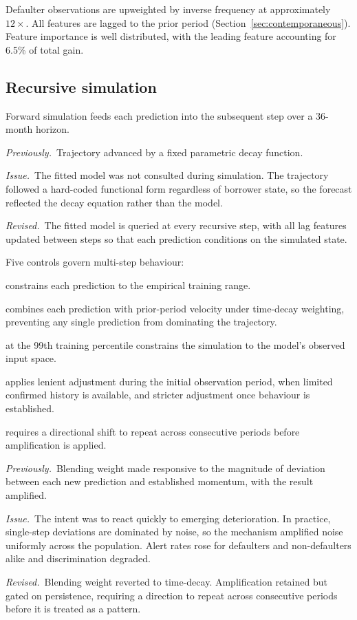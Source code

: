 \documentclass[11pt,a4paper]{article}
\newcommand{\designnote}[3]{%
  \par\vspace{7pt}
  \begin{list}{}{%
    \setlength{\leftmargin}{2em}\setlength{\rightmargin}{1em}%
    \setlength{\labelwidth}{0pt}\setlength{\labelsep}{0pt}%
    \setlength{\itemsep}{2pt}\setlength{\topsep}{0pt}%
    \setlength{\parsep}{0pt}}
    \item[]\textit{Previously.}~#1
    \item[]\textit{Issue.}~#2
    \item[]\textit{Revised.}~#3
  \end{list}
  \par\vspace{7pt}
}
\begin{document}
Defaulter observations are upweighted by inverse frequency at approximately $12\times$.
All features are lagged to the prior period (Section~\ref{sec:contemporaneous}). Feature
importance is well distributed, with the leading feature accounting for 6.5\% of total
gain.

\subsection{Recursive simulation}

Forward simulation feeds each prediction into the subsequent step over a 36-month
horizon.

\designnote{Trajectory advanced by a fixed parametric decay function.}
{The fitted model was not consulted during simulation. The trajectory followed a
hard-coded functional form regardless of borrower state, so the forecast reflected the
decay equation rather than the model.}
{The fitted model is queried at every recursive step, with all lag features updated
between steps so that each prediction conditions on the simulated state.}

Five controls govern multi-step behaviour:

\begin{description}[leftmargin=1.4em,style=nextline,font=\normalfont\itshape]
\item[Velocity clipping] constrains each prediction to the empirical training range.
\item[Momentum blending] combines each prediction with prior-period velocity under
time-decay weighting, preventing any single prediction from dominating the trajectory.
\item[Feature capping] at the 99th training percentile constrains the simulation to the
model's observed input space.
\item[Phase scaling] applies lenient adjustment during the initial observation period,
when limited confirmed history is available, and stricter adjustment once behaviour is
established.
\item[Persistence gating] requires a directional shift to repeat across consecutive
periods before amplification is applied.
\end{description}

\designnote{Blending weight made responsive to the magnitude of deviation between each
new prediction and established momentum, with the result amplified.}
{The intent was to react quickly to emerging deterioration. In practice, single-step
deviations are dominated by noise, so the mechanism amplified noise uniformly across the
population. Alert rates rose for defaulters and non-defaulters alike and discrimination
degraded.}
{Blending weight reverted to time-decay. Amplification retained but gated on persistence,
requiring a direction to repeat across consecutive periods before it is treated as a
pattern.}
\end{document}

